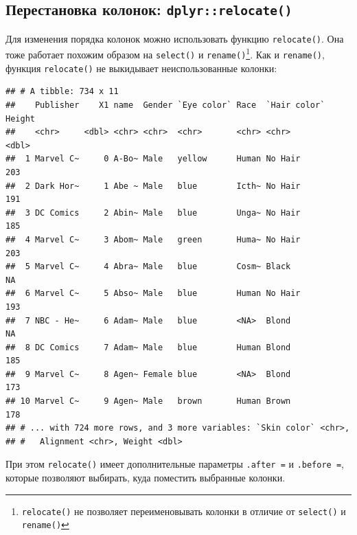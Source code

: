 \documentclass[]{book}
\newenvironment{Shaded}{\begin{snugshade}}{\end{snugshade}}
\newcommand{\KeywordTok}[1]{\textcolor[rgb]{0.13,0.29,0.53}{\textbf{#1}}}
\newcommand{\DataTypeTok}[1]{\textcolor[rgb]{0.13,0.29,0.53}{#1}}
\newcommand{\StringTok}[1]{\textcolor[rgb]{0.31,0.60,0.02}{#1}}
\newcommand{\OperatorTok}[1]{\textcolor[rgb]{0.81,0.36,0.00}{\textbf{#1}}}
\newcommand{\NormalTok}[1]{#1}
\begin{document}
\subsection{\texorpdfstring{Перестановка колонок:
\texttt{dplyr::relocate()}}{Перестановка колонок: dplyr::relocate()}}\label{tidy_relocate}

Для изменения порядка колонок можно использовать функцию
\texttt{relocate()}. Она тоже работает похожим образом на
\texttt{select()} и \texttt{rename()}\footnote{\texttt{relocate()} не
  позволяет переименовывать колонки в отличие от \texttt{select()} и
  \texttt{rename()}}. Как и \texttt{rename()}, функция
\texttt{relocate()} не выкидывает неиспользованные колонки:

\begin{Shaded}
\end{Shaded}

\begin{verbatim}
## # A tibble: 734 x 11
##    Publisher    X1 name  Gender `Eye color` Race  `Hair color` Height
##    <chr>     <dbl> <chr> <chr>  <chr>       <chr> <chr>         <dbl>
##  1 Marvel C~     0 A-Bo~ Male   yellow      Human No Hair         203
##  2 Dark Hor~     1 Abe ~ Male   blue        Icth~ No Hair         191
##  3 DC Comics     2 Abin~ Male   blue        Unga~ No Hair         185
##  4 Marvel C~     3 Abom~ Male   green       Huma~ No Hair         203
##  5 Marvel C~     4 Abra~ Male   blue        Cosm~ Black            NA
##  6 Marvel C~     5 Abso~ Male   blue        Human No Hair         193
##  7 NBC - He~     6 Adam~ Male   blue        <NA>  Blond            NA
##  8 DC Comics     7 Adam~ Male   blue        Human Blond           185
##  9 Marvel C~     8 Agen~ Female blue        <NA>  Blond           173
## 10 Marvel C~     9 Agen~ Male   brown       Human Brown           178
## # ... with 724 more rows, and 3 more variables: `Skin color` <chr>,
## #   Alignment <chr>, Weight <dbl>
\end{verbatim}

При этом \texttt{relocate()} имеет дополнительные параметры
\texttt{.after\ =} и \texttt{.before\ =}, которые позволяют выбирать,
куда поместить выбранные колонки.

\begin{Shaded}
\end{Shaded}
\end{document}
